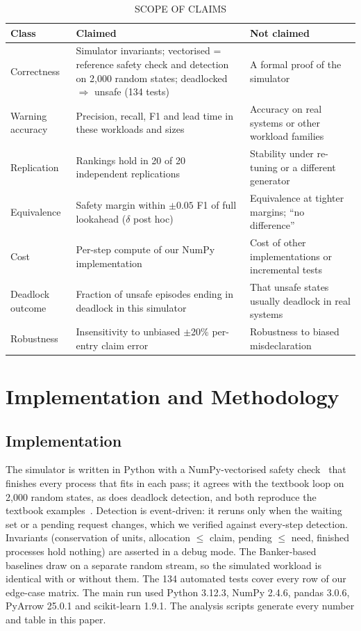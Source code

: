 \documentclass[conference]{IEEEtran}
\begin{document}
\begin{table}[t]
\centering\footnotesize
\caption{SCOPE OF CLAIMS}
\label{tab:claims}
\begin{tabular}{>{\raggedright\arraybackslash}p{1.5cm}>{\raggedright\arraybackslash}p{3.0cm}>{\raggedright\arraybackslash}p{2.9cm}}
\toprule
Class & Claimed & Not claimed \\
\midrule
Correctness & Simulator invariants; vectorised = reference safety check and detection on 2,000 random states; deadlocked $\Rightarrow$ unsafe (134 tests) & A formal proof of the simulator \\
Warning accuracy & Precision, recall, F1 and lead time in these workloads and sizes & Accuracy on real systems or other workload families \\
Replication & Rankings hold in 20 of 20 independent replications & Stability under re-tuning or a different generator \\
Equivalence & Safety margin within $\pm0.05$ F1 of full lookahead ($\delta$ post hoc) & Equivalence at tighter margins; ``no difference'' \\
Cost & Per-step compute of our NumPy implementation & Cost of other implementations or incremental tests \\
Deadlock outcome & Fraction of unsafe episodes ending in deadlock in this simulator & That unsafe states usually deadlock in real systems \\
Robustness & Insensitivity to unbiased $\pm$20\% per-entry claim error & Robustness to biased misdeclaration \\
\bottomrule
\end{tabular}
\end{table}

\section{Implementation and Methodology}\label{sec:method}

\subsection{Implementation}\label{sec:impl}
The simulator is written in Python with a NumPy-vectorised safety check~\cite{Harris2020} that finishes every process that fits in each pass; it agrees with the textbook loop on 2,000 random states, as does deadlock detection, and both reproduce the textbook examples~\cite{Silberschatz2018}. Detection is event-driven: it reruns only when the waiting set or a pending request changes, which we verified against every-step detection. Invariants (conservation of units, allocation $\le$ claim, pending $\le$ need, finished processes hold nothing) are asserted in a debug mode. The Banker-based baselines draw on a separate random stream, so the simulated workload is identical with or without them. The 134 automated tests cover every row of our edge-case matrix. The main run used Python 3.12.3, NumPy 2.4.6, pandas 3.0.6, PyArrow 25.0.1 and scikit-learn 1.9.1. The analysis scripts generate every number and table in this paper.
\end{document}
